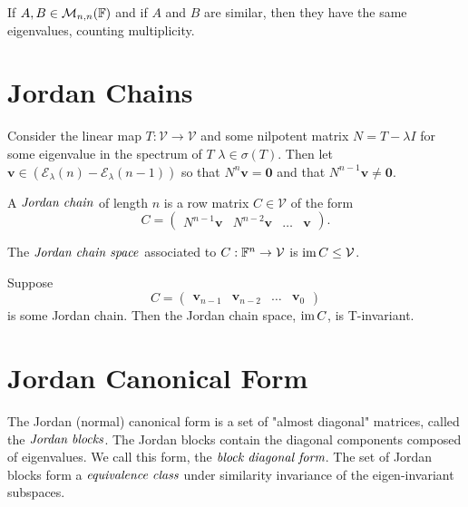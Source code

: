 \begin{cor}
	If $A,B \in \mathcal{M}_{n,n}(\mathbb{F})$ and if $A$ and $B$ are similar,
	then they have the same eigenvalues, counting multiplicity.
\end{cor}

\section{Jordan Chains} %

\begin{defn}
	Consider the linear map $T: \mathcal{V} \to \mathcal{V}$ and some nilpotent
	matrix $N = T - \lambda I$ for some eigenvalue in the spectrum of $T$ 
	$\lambda \in \sigma (T)$. Then let
	$\mathbf{v} \in \left( \mathcal{E}_{\lambda}(n) - \mathcal{E}_{\lambda}(n-1) \right)$
	so that $N^n \mathbf{v} = \mathbf{0}$ and that $N^{n-1} \mathbf{v} \neq \mathbf{0}$.

	A $\emph{Jordan chain}$ of length $n$ is a row matrix $C \in \mathcal{V}$ of the form
	\[
		C =
		\begin{pmatrix}
			N^{n-1} \mathbf{v} & N^{n-2} \mathbf{v} & \dots & \mathbf{v}
		\end{pmatrix}.
	\]

	The $\emph{Jordan chain space}$ associated to $C: \mathbb{F}^n \to \mathcal{V}$ is $\operatorname{im} C \leq \mathcal{V}$.
\end{defn}

\begin{prop}
	Suppose
	\[
		C =
		\begin{pmatrix}
			\mathbf{v}_{n-1} & \mathbf{v}_{n-2} & \dots & \mathbf{v}_{0}
		\end{pmatrix}
	\]
	is some Jordan chain. Then the Jordan chain space, $\operatorname{im} C$, is T-invariant.
\end{prop}

\section{Jordan Canonical Form} %
\label{sec:JordanForm}

The Jordan (normal) canonical form is a set of "almost diagonal"
matrices, called the $\emph{Jordan blocks}$. The Jordan blocks
contain the diagonal components composed of eigenvalues. We call
this form, the $\emph{block diagonal form}$. The set of Jordan
blocks form a $\emph{equivalence class}$ under similarity invariance
of the eigen-invariant subspaces.

